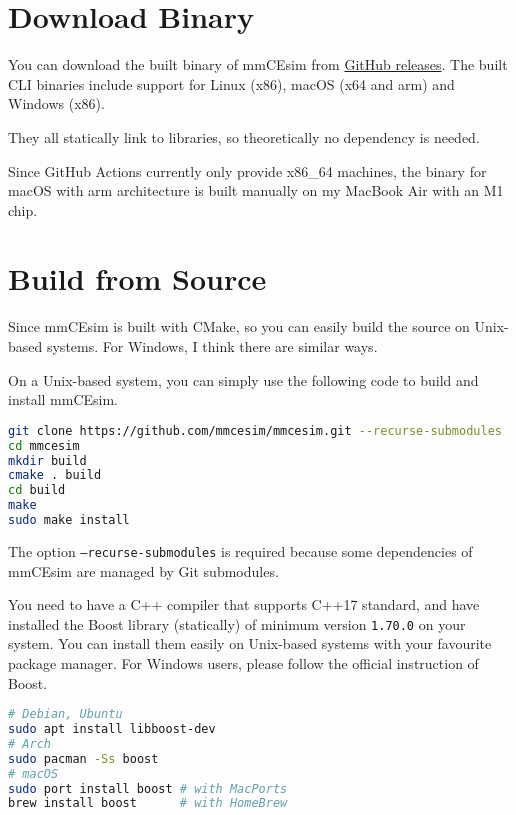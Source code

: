 \section{Download Binary}
You can download the built binary of mmCEsim from \href{https://github.com/mmcesim/mmcesim/releases}{GitHub releases}.
The built CLI binaries include support for Linux (x86), macOS (x64 and arm) and Windows (x86).

They all statically link to libraries, so theoretically no dependency is needed.

\begin{tip}[Note]
  Since GitHub Actions currently only provide x86\_64 machines,
  the binary for macOS with arm architecture is built manually on my MacBook Air with an M1 chip.
\end{tip}

\section{Build from Source}

Since mmCEsim is built with CMake, so you can easily build the source on Unix-based systems.
For Windows, I think there are similar ways.

On a Unix-based system, you can simply use the following code to build and install mmCEsim.
\begin{lstlisting}[language=sh, morekeywords={git, mkdir, cmake, make, sudo}, alsoletter={.}]
git clone https://github.com/mmcesim/mmcesim.git --recurse-submodules
cd mmcesim
mkdir build
cmake . build
cd build
make
sudo make install
\end{lstlisting}

\begin{remark}
  The option \texttt{--recurse-submodules} is required because some dependencies of mmCEsim
  are managed by Git submodules.
\end{remark}

You need to have a C++ compiler that supports C++17 standard,
and have installed the Boost library (statically) of minimum version \texttt{1.70.0} on your system.
You can install them easily on Unix-based systems with your favourite package manager.
For Windows users, please follow the official instruction of Boost.
\begin{lstlisting}[language=sh, morekeywords={sudo, apt, pacman, port, brew}]
# Debian, Ubuntu
sudo apt install libboost-dev
# Arch
sudo pacman -Ss boost
# macOS
sudo port install boost # with MacPorts
brew install boost      # with HomeBrew
\end{lstlisting}

